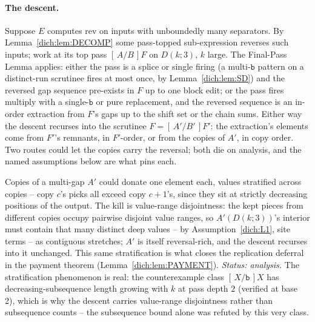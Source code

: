 \paragraph{The descent.}
Suppose $E$ computes $\mathrm{rev}$ on inputs with unboundedly many
separators.  By Lemma~\ref{dich:lem:DECOMP} some pass-topped
sub-expression reverses such inputs; work at its top pass
$[\,A/B\,]F$ on $D(k;3)$, $k$ large.  The Final-Pass Lemma applies:
either the pass is a splice or single firing (a multi-$\mathtt b$
pattern on a distinct-run scrutinee fires at most once, by
Lemma~\ref{dich:lem:SD}) and the reversed gap sequence pre-exists in
$F$ up to one block edit; or the pass fires multiply with a
single-$\mathtt b$ or pure replacement, and the reversed sequence is
an in-order extraction from $F$'s gaps up to the shift set or the
chain sums.  Either way the descent recurses into the scrutinee
$F = [\,A'/B'\,]F'$: the extraction's elements come from $F'$'s
remnants, in $F'$-order, or from the copies of $A'$, in copy order.
Two routes could let the copies carry the reversal; both die on
analysis, and the named assumptions below are what pins each.

\begin{proposition}
    \label{dich:escapeA}
    Copies of a multi-gap $A'$ could donate one element each, values
    stratified across copies -- copy $c$'s picks all exceed copy
    $c{+}1$'s, since they sit at strictly decreasing positions of the
    output.  The kill is value-range disjointness: the kept pieces
    from different copies occupy pairwise disjoint value ranges, so
    $A'(D(k;3))$'s interior must contain that many distinct deep
    values -- by Assumption~\ref{dich:L1}, site terms -- as contiguous
    stretches; $A'$ is itself reversal-rich, and the descent recurses
    into it unchanged.  This same stratification is what closes the
    replication deferral in the payment theorem
    (Lemma~\ref{dich:lem:PAYMENT}).
    \emph{Status: analysis.}  The stratification phenomenon is real:
    the counterexample class $[\,X/\mathtt b\,]X$ has
    decreasing-subsequence length growing with $k$ at pass depth $2$
    (verified at base 2), which is why the descent carries value-range
    disjointness rather than subsequence counts -- the subsequence
    bound alone was refuted by this very class.
\end{proposition}


